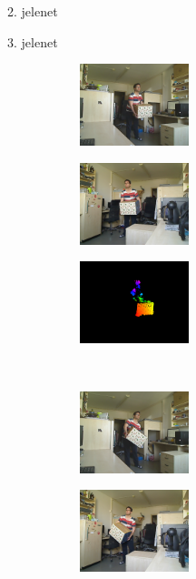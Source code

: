 \begin{frame}{2. jelenet}
\begin{figure}
\end{figure}


\end{frame}

\begin{frame}{3. jelenet}

\vspace{-13pt}
\begin{figure}
\centering
\begin{subfigure}[b]{.32\linewidth}
	\centering
	\includegraphics[width=90pt]{figures/scene3/left_152.png}
  \end{subfigure}
\begin{subfigure}[b]{.32\linewidth}
	\centering
	\includegraphics[width=90pt]{figures/scene3/right_152.png}
  \end{subfigure}
\begin{subfigure}[b]{.32\linewidth}
	\centering
	\includegraphics[width=90pt]{figures/scene3/vis_152.png}
  \end{subfigure}\\\vspace{3pt}
 \begin{subfigure}[b]{.32\linewidth}
	\centering
	\includegraphics[width=90pt]{figures/scene3/left_196.png}
  \end{subfigure}
\begin{subfigure}[b]{.32\linewidth}
	\centering
	\includegraphics[width=90pt]{figures/scene3/right_196.png}

\end{subfigure}
\end{figure}
\end{frame}
